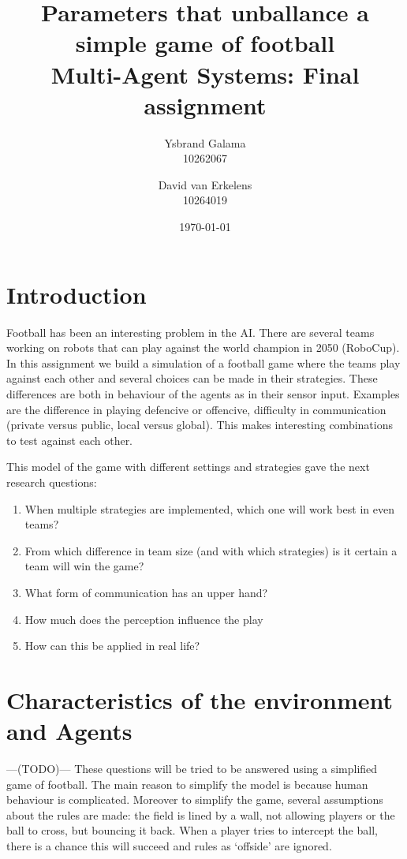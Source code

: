 \documentclass{article}
\title{Parameters that unballance a simple game of football \\ {\Large Multi-Agent Systems: Final assignment} }
\author{Ysbrand Galama \\ 10262067 \and David van Erkelens \\ 10264019}
\date{\today}
\newcommand{\todo}{---(TODO)---\marginnote{TODO} }
\begin{document}
\maketitle
\tableofcontents

\section{Introduction}
Football has been an interesting problem in the AI.
There are several teams working on robots that can play against the world champion in 2050 (RoboCup).
In this assignment we build a simulation of a football game where the teams play against each other and several choices can be made in their strategies.
These differences are both in behaviour of the agents as in their sensor input.
Examples are the difference in playing defencive or offencive, difficulty in communication (private versus public, local versus global).
This makes interesting combinations to test against each other.

This model of the game with different settings and strategies gave the next research questions:
\begin{enumerate}
    \item When multiple strategies are implemented, which one will work best in even teams?
    \item From which difference in team size (and with which strategies) is it certain a team will win the game?
    \item What form of communication has an upper hand?
    \item How much does the perception influence the play
    \item How can this be applied in real life?
\end{enumerate}


\section{Characteristics of the environment and Agents}
\todo
These questions will be tried to be answered using a simplified game of football.
The main reason to simplify the model is because human behaviour is complicated.
Moreover to simplify the game, several assumptions about the rules are made: the field is lined by a wall, not allowing players or the ball to cross, but bouncing it back.
When a player tries to intercept the ball, there is a chance this will succeed and rules as `offside' are ignored.
\end{document}
